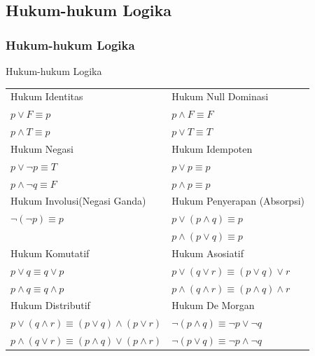 \documentclass[handout]{beamer}
\theoremstyle{definition}
\theoremstyle{example}
\begin{document}
\subsection{Hukum-hukum Logika}
\begin{frame}
	\frametitle{Hukum-hukum Logika}
	\begin{block}{Hukum-hukum Logika}
	\small	
	   \begin{tabular}{ | l | l |}
	   	\hline
	   	 Hukum Identitas  & Hukum Null Dominasi  \\ 
	   	 $p\vee F \equiv p$  & $p\wedge F \equiv F$  \\  
	   	 $p\wedge T \equiv p$  &  $p\vee T \equiv T$ \\ \hline
	   	  Hukum Negasi & Hukum Idempoten \\	
	   	  $p\vee \neg p \equiv T$  & $p\vee p \equiv p$  \\  
	   	  $p\wedge \neg q \equiv F$  &  $p\wedge p \equiv p$ \\ \hline
	   	  Hukum Involusi(Negasi Ganda) & Hukum Penyerapan (Absorpsi) \\	
	   	  $\neg(\neg p) \equiv p$  & $p \vee (p \wedge q) \equiv p$  \\  
	   	                                 &  $p \wedge (p \vee q) \equiv p$ \\ \hline
	   	  Hukum Komutatif & Hukum Asosiatif \\	
	   	  $p \vee q \equiv q \vee p$  & $ p \vee (q \vee r) \equiv (p \vee q) \vee r$  \\  
	   	  $p \wedge q \equiv q \wedge p$  &  $ p \wedge (q \wedge r) \equiv (p \wedge q) \wedge r$ \\ \hline	
	   	 Hukum Distributif & Hukum De Morgan \\	
	   	 $p \vee (q \wedge r) \equiv (p \vee q)\wedge (p \vee r) $  & $ \neg(p \wedge q) \equiv \neg p \vee \neg q$  \\  
	   	 $p \wedge (q \vee r) \equiv (p \wedge q)\vee (p \wedge r)$  &  $ \neg(p \vee q) \equiv \neg p \wedge \neg q$ \\
	   	\hline
	   \end{tabular}
	\end{block}
\end{frame}
\end{document}
